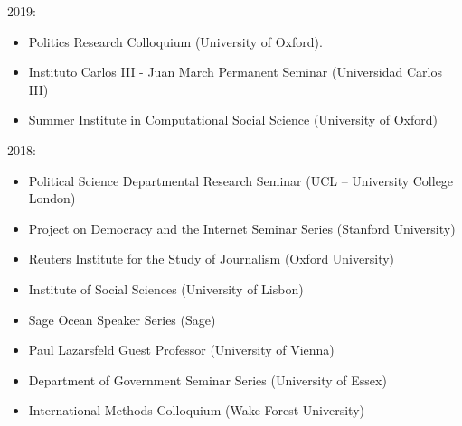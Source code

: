 \documentclass[margin,line,11pt]{resume}
\begin{document}
\begin{resume}
2019: 
\begin{itemize} 
\item Politics Research Colloquium (University of Oxford).
\item Instituto Carlos III - Juan March Permanent Seminar (Universidad Carlos III)
\item Summer Institute in Computational Social Science (University of Oxford)
\end{itemize}
2018: 
\begin{itemize} 
\item Political Science Departmental Research Seminar (UCL -- University College London)
\item Project on Democracy and the Internet Seminar Series (Stanford University)
\item Reuters Institute for the Study of Journalism (Oxford University)
\item Institute of Social Sciences (University of Lisbon)
\item Sage Ocean Speaker Series (Sage)
\item Paul Lazarsfeld Guest Professor (University of Vienna)
\item Department of Government Seminar Series (University of Essex)
\item International Methods Colloquium (Wake Forest University)


\end{itemize}
\end{resume}
\end{document}
